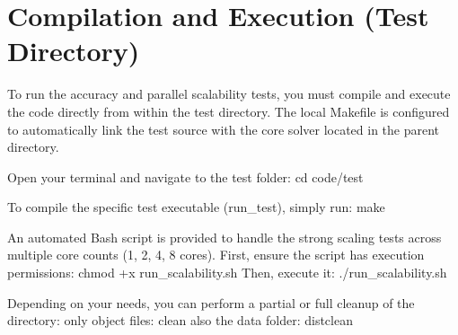 \chapter{Compilation and Execution (Test Directory)}
\hypertarget{md_test_2README}{}\label{md_test_2README}
\label{md_test_2README_autotoc_md0}%
%
 To run the accuracy and parallel scalability tests, you must compile and execute the code directly from within the {\ttfamily test} directory. The local {\ttfamily Makefile} is configured to automatically link the test source with the core solver located in the parent directory.

Open your terminal and navigate to the test folder\+: {\ttfamily cd code/test}

To compile the specific test executable (run\+\_\+test), simply run\+: {\ttfamily make}

An automated Bash script is provided to handle the strong scaling tests across multiple core counts (1, 2, 4, 8 cores). First, ensure the script has execution permissions\+: {\ttfamily chmod +x run\+\_\+scalability.\+sh} Then, execute it\+: {\ttfamily ./run\+\_\+scalability.sh}

Depending on your needs, you can perform a partial or full cleanup of the directory\+: only object files\+: {\ttfamily clean} also the data folder\+: {\ttfamily distclean} 